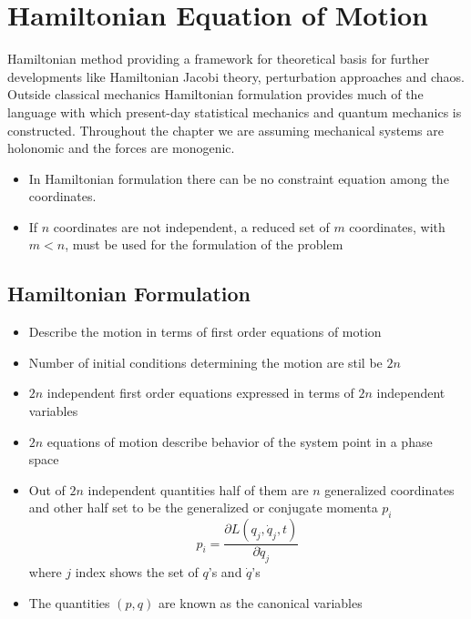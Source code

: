 \chapter{Hamiltonian Equation of Motion}
 Hamiltonian method providing a framework for theoretical basis for further developments like Hamiltonian Jacobi theory, perturbation approaches and chaos. Outside classical mechanics Hamiltonian formulation provides much of the language with which present-day statistical mechanics and quantum mechanics is constructed. Throughout the chapter we are assuming mechanical systems are holonomic and the forces are monogenic.
 \begin{itemize}
 	\item In Hamiltonian formulation there can be no constraint equation among the coordinates.
 	\item If $n$ coordinates are not independent, a reduced set of $m$ coordinates, with $m<n$, must be used for the formulation of the problem
 \end{itemize}
\section{Hamiltonian Formulation}
\begin{itemize}
	\item Describe the motion in terms of first order equations of motion
	\item Number of initial conditions determining the motion are stil be $2n$
	\item $2n$ independent first order equations expressed in terms of $2n$ independent variables
	\item $2n$ equations of motion describe behavior of the system point in a phase space
	\item Out of $2n$ independent quantities half of them are $n$ generalized coordinates and other half set to be the generalized or conjugate momenta $p_i$
	\begin{equation}
	  p_i=\frac{\partial L(q_j,\dot{q}_j, t)}{\partial \dot{q}_j}
	\end{equation}
	where $j$ index shows the set of $q$'s and $\dot{q}$'s
	\item The quantities $(p,q)$ are known as the canonical variables
\end{itemize}
